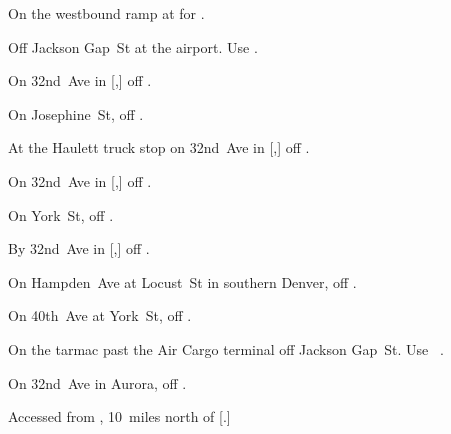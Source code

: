 
\begin{LocationList}

On the westbound ramp at   for .

Off Jackson Gap~St at the airport.
Use  .

On 32nd~Ave in [,] off  .

\Location{\GarageHQ \Garage}
On Josephine~St, off  .

At the Haulett truck stop on 32nd~Ave in [,] off  .

On 32nd~Ave in [,] off  .

On York~St, off  .

\Location{\RecruitmentAgency \Recruitment}
By 32nd~Ave in [,] off  .

On  Hampden~Ave at Locust~St in southern Denver, off  .

On 40th~Ave at York~St, off  .

On the tarmac past the Air Cargo terminal off Jackson Gap~St.
Use~ .

On 32nd~Ave in Aurora, off  .

Accessed from , 10~miles north of [.]

\end{LocationList}
